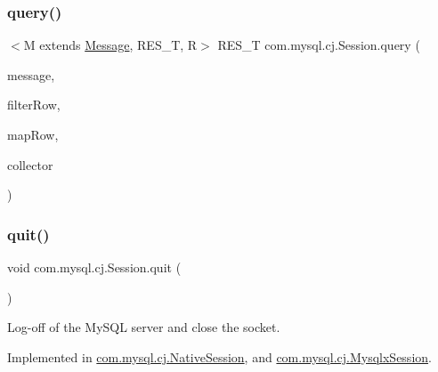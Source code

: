 \subsubsection{\texorpdfstring{query()}{query()}}
{\footnotesize\ttfamily $<$M extends \mbox{\hyperlink{interfacecom_1_1mysql_1_1cj_1_1protocol_1_1_message}{Message}}, R\+E\+S\+\_\+T, R$>$ R\+E\+S\+\_\+T com.\+mysql.\+cj.\+Session.\+query (\begin{DoxyParamCaption}\item[{M}]{message,  }\item[{Predicate$<$ \mbox{\hyperlink{interfacecom_1_1mysql_1_1cj_1_1result_1_1_row}{Row}} $>$}]{filter\+Row,  }\item[{Function$<$ \mbox{\hyperlink{interfacecom_1_1mysql_1_1cj_1_1result_1_1_row}{Row}}, R $>$}]{map\+Row,  }\item[{Collector$<$ R, ?, R\+E\+S\+\_\+T $>$}]{collector }\end{DoxyParamCaption})}

\mbox{\label{interfacecom_1_1mysql_1_1cj_1_1_session_af29d73c4e1343fb4bee53b0bac720108}} 
\subsubsection{\texorpdfstring{quit()}{quit()}}
{\footnotesize\ttfamily void com.\+mysql.\+cj.\+Session.\+quit (\begin{DoxyParamCaption}{ }\end{DoxyParamCaption})}

Log-\/off of the My\+S\+QL server and close the socket. 

Implemented in \mbox{\hyperlink{classcom_1_1mysql_1_1cj_1_1_native_session_a900fc165192f609b5eddb095ee729ae3}{com.\+mysql.\+cj.\+Native\+Session}}, and \mbox{\hyperlink{classcom_1_1mysql_1_1cj_1_1_mysqlx_session_a20bd0339551fe3c5bb9b5806e2036ed3}{com.\+mysql.\+cj.\+Mysqlx\+Session}}.

\mbox{\label{interfacecom_1_1mysql_1_1cj_1_1_session_a1adcdda54ca553c5449119570e072c7a}} 
